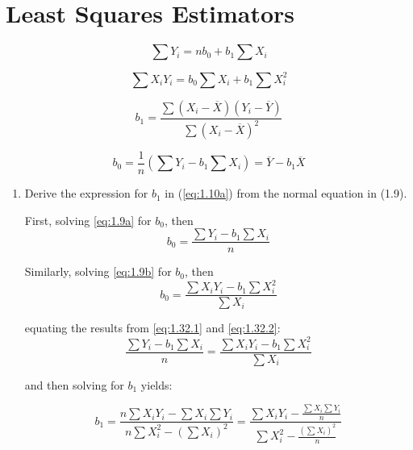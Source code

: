 \documentclass{article}
\begin{document}
\section{Least Squares Estimators}
\begin{equation} \tag{1.9a}
\sum Y_{i}=nb_{0}+b_{1}\sum X_{i}
\label{eq:1.9a}
\end{equation}

\begin{equation} \tag{1.9b}
\sum X_{i}Y_{i}=b_{0}\sum X_{i}+b_{1}\sum X_{i}^{2}
\label{eq:1.9b}
\end{equation}

\begin{equation} \tag{1.10a}
b_{1}=\frac{\sum (X_{i}-\overline{X})(Y_{i}-\overline{Y})}{\sum (X_{i}-\overline{X})^{2}}
\label{eq:1.10a}
\end{equation}

\begin{equation} \tag{1.10b}
b_{0}=\frac{1}{n}(\sum Y_{i}-b_{1} \sum X_{i})=\overline{Y}-b_{1}\overline{X}
\label{eq:1.10b}
\end{equation}
\begin{enumerate}[label=(\alph*)]
\item Derive the expression for $b_{1}$ in (\ref{eq:1.10a}) from the normal equation in (1.9).

First, solving \ref{eq:1.9a} for $b_{0}$, then
\begin{equation} \tag{1.32.1}
b_{0}=\frac{\sum Y_{i}-b_{1}\sum X_{i}}{n}
\label{eq:1.32.1}
\end{equation}

Similarly, solving \ref{eq:1.9b} for $b_{0}$, then
\begin{equation} \tag{1.32.2}
b_{0}=\frac{\sum X_{i}Y_{i}-b_{1}\sum X_{i}^{2}}{\sum X_{i}}
\label{eq:1.32.2}
\end{equation}

equating the results from \ref{eq:1.32.1} and \ref{eq:1.32.2}:
\begin{equation} \tag{1.32.3}
\frac{\sum Y_{i}-b_{1}\sum X_{i}}{n}=\frac{\sum X_{i}Y_{i}-b_{1}\sum X_{i}^{2}}{\sum X_{i}}
\label{eq:1.32.3}
\end{equation}

and then solving for $b_{1}$ yields:

\begin{equation} \tag{1.32.4}
b_{1}=\frac{n\sum X_{i}Y_{i}-\sum X_{i} \sum Y_{i}}{n\sum X_{i}^{2}-(\sum X_{i})^{2}}=\frac{\sum X_{i} Y_{i}-\frac{\sum X_{i} \sum Y_{i}}{n}}{\sum X_{i}^{2}-\frac{(\sum X_{i})^{2}}{n}}
\label{eq:1.32.4}
\end{equation}
\end{enumerate}
\end{document}
